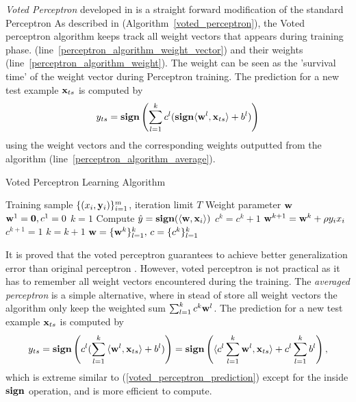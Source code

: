 \textit{Voted Perceptron} developed in \citep{Freund99} is a straight forward modification of the standard Perceptron
As described in (Algorithm~\ref{voted_perceptron}), the Voted perceptron algorithm keeps track all weight vectors that appears during training phase. (line~\ref{perceptron_algorithm_weight_vector}) and their weights (line~\ref{perceptron_algorithm_weight}).
The weight can be seen as the 'survival time' of the weight vector during Perceptron training.
The prediction for a new test example $\mathbf {x}_{ts}$ is computed by 
\begin{align}
	y_{ts} = \textbf{sign}\left({\sum_{l=1}^{k}c^l(\textbf{sign}{\langle \mathbf {w}^l, \mathbf {x}_{ts} \rangle+b^{l}}})\right) \label{voted_perceptron_prediction}
\end{align}
using the weight vectors and the corresponding weights outputted from the algorithm (line~\ref{perceptron_algorithm_average}).
\begin{algorithm}
\caption{Voted Perceptron Learning Algorithm}
\label{voted_perceptron}
\begin{algorithmic}[1]
	\REQUIRE Training sample $\lbrace (x_i,\mathbf {y}_i)\rbrace_{i=1}^m$, iteration limit $T$
	\ENSURE Weight parameter $\mathbf {w}$
	\STATE $\mathbf {w}^{1}=\mathbf {0},c^1=0$
	\STATE $k=1$
			\STATE Compute $\hat{y} = \textbf{sign}(\langle \mathbf {w}, \mathbf {x}_i \rangle)$
				\STATE $c^k = c^k + 1$
			\ELSE
				\STATE $\mathbf {w}^{k+1} = \mathbf {w}^{k} + \rho y_ix_i$ \label{perceptron_algorithm_weight_vector}
				\STATE $c^{k+1} =1$ \label{perceptron_algorithm_weight}
				\STATE $k=k+1$
			\ENDIF
		\ENDFOR
	\ENDFOR
	\RETURN $\mathbf {w} = \{\mathbf {w}^{k}\}_{l=1}^{k},\,c = \{c^{k}\}_{l=1}^{k}$ \label{perceptron_algorithm_average}
\end{algorithmic}
\end{algorithm}

It is proved that the voted perceptron guarantees to achieve better generalization error than original perceptron \citep{}.
However, voted perceptron is not practical as it has to remember all weight vectors encountered during the training.
The \textit{averaged perceptron} is a simple alternative, where in stead of store all weight vectors the algorithm only keep the weighted sum $\sum_{l=1}^{k}c^k\mathbf {w}^l$. 
The prediction for a new test example $\mathbf {x}_{ts}$ is computed by 
\begin{align*}
	y_{ts} = \textbf{sign}\left(c^l({\sum_{l=1}^{k}{\langle \mathbf {w}^l, \mathbf {x}_{ts} \rangle+b^{l}}})\right) = \textbf{sign}\left({{\langle c^l\sum_{l=1}^{k}\mathbf {w}^l, \mathbf {x}_{ts} \rangle+c^l\sum_{l=1}^{k}b^{l}}}\right),
\end{align*}
which is extreme similar to (\ref{voted_perceptron_prediction}) except for the inside $\textbf{sign}$ operation, and is more efficient to compute.

